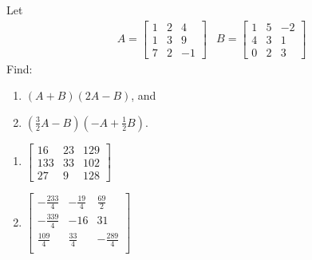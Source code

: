 \begin{Exercise}
Let 
\begin{align*}
& A =
\begin{bmatrix}
1 & 2 & 4\\
1 & 3 & 9\\
7 & 2 & -1
\end{bmatrix}
& B =
\begin{bmatrix}
1 & 5 & -2\\
4 & 3 & 1\\
0 & 2 & 3
\end{bmatrix}
\end{align*}
Find:
\begin{enumerate}[label=(\alph*)]
\item $(A+B)(2A-B)$, and
\item $(\frac{3}{2}A - B)(-A + \frac{1}{2}B)$.
\end{enumerate}
\end{Exercise}
\begin{Answer}
\begin{enumerate}[label=(\alph*)]
\item $\begin{bmatrix}
16 & 23 & 129 \\
133 & 33 & 102 \\
27 & 9 & 128
\end{bmatrix}$
\item $\begin{bmatrix}
-\frac{233}{4} & -\frac{19}{4} & \frac{69}{2} \\
-\frac{339}{4} & -16 & 31 \\
\frac{109}{4} & \frac{33}{4} & -\frac{289}{4} \\
\end{bmatrix}$
\end{enumerate}
\end{Answer}

